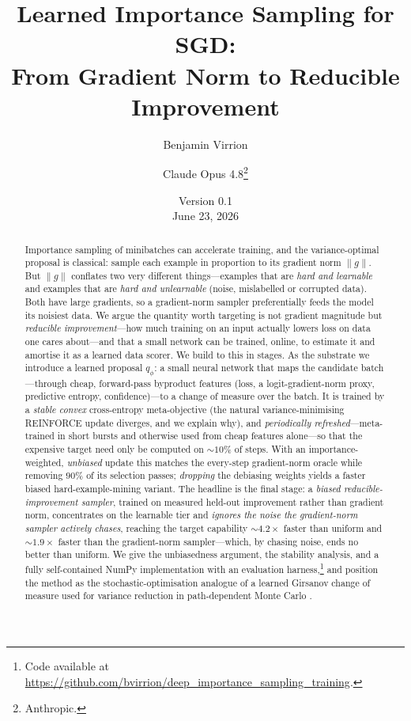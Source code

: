 \documentclass[11pt]{article}
\title{\textbf{Learned Importance Sampling for SGD:\\ From Gradient Norm to
Reducible Improvement}}
\author{Benjamin Virrion \and Claude Opus 4.8\thanks{Anthropic.}}
\date{Version 0.1 \\[2pt] June 23, 2026}
\begin{document}
\maketitle

\begin{abstract}
Importance sampling of minibatches can accelerate training, and the
variance-optimal proposal is classical: sample each example in proportion to its
gradient norm $\|g\|$. But $\|g\|$ conflates two very different things---examples
that are \emph{hard and learnable} and examples that are \emph{hard and
unlearnable} (noise, mislabelled or corrupted data). Both have large gradients,
so a gradient-norm sampler preferentially feeds the model its noisiest data. We
argue the quantity worth targeting is not gradient magnitude but \emph{reducible
improvement}---how much training on an input actually lowers loss on data one
cares about---and that a small network can be trained, online, to estimate it and
amortise it as a learned data scorer. We build to this in stages. As the
substrate we introduce a learned proposal $q_\phi$: a small neural network that
maps the candidate batch---through cheap, forward-pass byproduct features (loss, a
logit-gradient-norm proxy, predictive entropy, confidence)---to a change of
measure over the batch. It is trained by a \emph{stable convex} cross-entropy
meta-objective (the natural variance-minimising REINFORCE update diverges, and we
explain why), and \emph{periodically refreshed}---meta-trained in short bursts and
otherwise used from cheap features alone---so that the expensive target need only
be computed on $\sim\!10\%$ of steps. With an importance-weighted, \emph{unbiased}
update this matches the every-step gradient-norm oracle while removing $90\%$ of
its selection passes; \emph{dropping} the debiasing weights yields a faster biased
hard-example-mining variant. The headline is the final stage: a \emph{biased
reducible-improvement sampler}, trained on measured held-out improvement rather
than gradient norm, concentrates on the learnable tier and \emph{ignores the
noise the gradient-norm sampler actively chases}, reaching the target capability
$\sim\!4.2\times$ faster than uniform and $\sim\!1.9\times$ faster than the
gradient-norm sampler---which, by chasing noise, ends no better than uniform. We
give the unbiasedness argument, the stability analysis, and a fully
self-contained NumPy implementation with an evaluation harness,\footnote{Code
available at \url{https://github.com/bvirrion/deep_importance_sampling_training}.}
and position the
method as the stochastic-optimisation analogue of a learned Girsanov change of
measure used for variance reduction in path-dependent Monte Carlo
\citep{virrion2020}.
\end{abstract}
\end{document}
